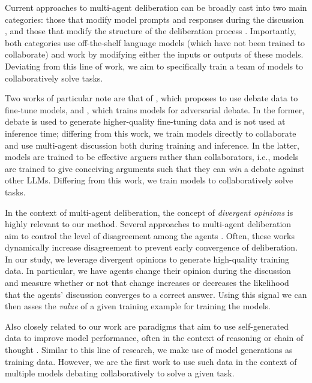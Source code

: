 Current approaches to multi-agent deliberation can be broadly cast into two main categories: those that modify model prompts and responses during the discussion \cite{liang2023encouraging,khan2024debating,rasal2024llm,feng2024don,yang2024confidence}, and those that modify the structure of the deliberation process \cite{li2023camel,hong2023metagpt,liu2023dynamic,li2024improving,wang2023unleashing,wu2023autogen,chen2023reconcile,chang2024socrasynth}. 
Importantly, both categories use off-the-shelf language models (which have not been trained to collaborate) and work by modifying either the inputs or outputs of these models.
Deviating from this line of work, we aim to specifically train a team of models to collaboratively solve tasks. 

Two works of particular note are that of \cite{subramaniam2024debategpt}, which proposes to use debate data to fine-tune models, and \cite{li2024can}, which trains models for adversarial debate. 
In the former, debate is used to generate higher-quality fine-tuning data and is not used at inference time; differing from this work, we train models directly to collaborate and use multi-agent discussion both during training and inference.
In the latter, models are trained to be effective arguers rather than collaborators, i.e., models are trained to give conceiving arguments such that they can \emph{win} a debate against other LLMs. 
Differing from this work, we train models to collaboratively solve tasks.


In the context of multi-agent deliberation, the concept of \emph{divergent opinions} is highly relevant to our method. 
Several approaches to multi-agent deliberation aim to control the level of disagreement among the agents  \cite{liang2023encouraging,khan2024debating,chang2024evince}. 
Often, these works dynamically increase disagreement to prevent early convergence of deliberation.
In our study, we leverage divergent opinions to generate high-quality training data. 
In particular, we have agents change their opinion during the discussion and measure whether or not that change increases or decreases the likelihood that the agents' discussion converges to a correct answer. Using this signal we can then asses the \emph{value} of a given training example for training the models.

Also closely related to our work are paradigms that aim to use self-generated data to improve model performance, often in the context of reasoning or chain of thought \cite{trung-etal-2024-reft,huang2024key,xiong2024watchstepllmagent, chen2024selfplayfinetuningconvertsweak, pang2024iterativereasoningpreferenceoptimization}. 
Similar to this line of research, we make use of model generations as training data. However, we are the first work to use such data in the context of multiple models debating collaboratively to solve a given task.
